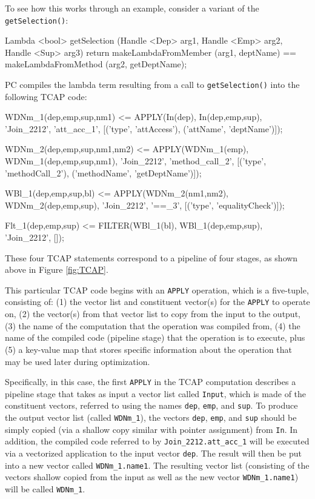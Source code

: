 To see how this works through an example, consider a variant of the \texttt{getSelection()}:

\begin{codesmall} 
Lambda <bool> getSelection (Handle <Dep> arg1, 
     Handle <Emp> arg2, Handle <Sup> arg3) {
	return makeLambdaFromMember (arg1, deptName) == 
	       makeLambdaFromMethod (arg2, getDeptName);  }
\end{codesmall}

\noindent PC compiles the lambda term resulting from a call to \texttt{getSelection()} into the following TCAP code:

\begin{codesmall}
WDNm_1(dep,emp,sup,nm1) <= APPLY(In(dep), 
   In(dep,emp,sup), 'Join_2212', 'att_acc_1', 
      [('type', 'attAccess'), ('attName', 'deptName')]);

WDNm_2(dep,emp,sup,nm1,nm2) <= APPLY(WDNm_1(emp), 
   WDNm_1(dep,emp,sup,nm1), 'Join_2212',
      'method_call_2', [('type', 'methodCall_2'), 
          ('methodName', 'getDeptName')]);

WBl_1(dep,emp,sup,bl) <= APPLY(WDNm_2(nm1,nm2),
   WDNm_2(dep,emp,sup), 'Join_2212', '==_3', 
      [('type', 'equalityCheck')]);

Flt_1(dep,emp,sup) <= FILTER(WBl_1(bl), 
   WBl_1(dep,emp,sup), 'Join_2212', []);
\end{codesmall}

\noindent
These four TCAP statements correspond to a pipeline of four stages,
as shown above in Figure \ref{fig:TCAP}.

This particular TCAP code begins with an \texttt{APPLY} operation, which is a five-tuple, consisting of: (1) the vector list and constituent
vector(s) for the \texttt{APPLY} to operate on, (2) the vector(s) from that vector list to copy
from the input to the output, (3) the name of the computation that the operation was compiled from, (4) the name of the compiled code (pipeline stage)
that the operation is to execute, plus (5) a key-value map that stores specific information about the operation that may be used 
later during optimization.

Specifically, in this case, the first \texttt{APPLY} in the TCAP computation describes a pipeline stage that
takes as input 
a vector list called \texttt{Input}, which is made of the constituent vectors, referred to using 
the names \texttt{dep}, \texttt{emp}, and \texttt{sup}.
To produce the output vector list (called \texttt{WDNm\_1}), the vectors
\texttt{dep}, \texttt{emp}, and \texttt{sup} should be simply copied
(via a shallow copy similar with pointer assignment) from \texttt{In}.
In addition, the compiled code referred to by \texttt{Join\_2212.att\_acc\_1} will be executed via a vectorized application to the input
vector \texttt{dep}.  The result will then be put into a new vector called 
\texttt{WDNm\_1.name1}.
The resulting vector list (consisting of the vectors shallow copied from the input as well as the new vector \texttt{WDNm\_1.name1})
will be called \texttt{WDNm\_1}.  

